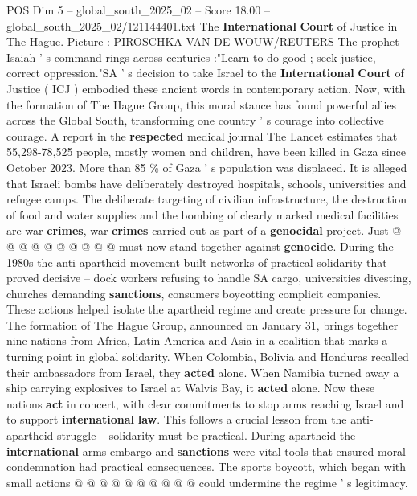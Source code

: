 \begin{textsample}{POS Dim 5 – global\_south\_2025\_02 – Score 18.00 – global\_south\_2025\_02/121144401.txt}  \label{ex:f5_pos_212}
The \textbf{International} \textbf{Court} of Justice in The Hague.
Picture : PIROSCHKA VAN DE WOUW/REUTERS The prophet Isaiah ' s command rings across centuries :"Learn to do good ; seek justice, correct oppression."SA ' s decision to take Israel to the \textbf{International} \textbf{Court} of Justice ( ICJ ) embodied these ancient words in contemporary action.
Now, with the formation of The Hague Group, this moral stance has found powerful allies across the Global South, transforming one country ' s courage into collective courage.
A report in the \textbf{respected} medical journal The Lancet estimates that 55,298-78,525 people, mostly women and children, have been killed in Gaza since October 2023.
More than 85 \% of Gaza ' s population was displaced.
It is alleged that Israeli bombs have deliberately destroyed hospitals, schools, universities and refugee camps.
The deliberate targeting of civilian infrastructure, the destruction of food and water supplies and the bombing of clearly marked medical facilities are war \textbf{crimes}, war \textbf{crimes} carried out as part of a \textbf{genocidal} project.
Just @ @ @ @ @ @ @ @ @ @ must now stand together against \textbf{genocide}.
During the 1980s the anti-apartheid movement built networks of practical solidarity that proved decisive -- dock workers refusing to handle SA cargo, universities divesting, churches demanding \textbf{sanctions}, consumers boycotting complicit companies.
These actions helped isolate the apartheid regime and create pressure for change.
The formation of The Hague Group, announced on January 31, brings together nine nations from Africa, Latin America and Asia in a coalition that marks a turning point in global solidarity.
When Colombia, Bolivia and Honduras recalled their ambassadors from Israel, they \textbf{acted} alone.
When Namibia turned away a ship carrying explosives to Israel at Walvis Bay, it \textbf{acted} alone.
Now these nations \textbf{act} in concert, with clear commitments to stop arms reaching Israel and to support \textbf{international} \textbf{law}.
This follows a crucial lesson from the anti-apartheid struggle -- solidarity must be practical.
During apartheid the \textbf{international} arms embargo and \textbf{sanctions} were vital tools that ensured moral condemnation had practical consequences.
The sports boycott, which began with small actions @ @ @ @ @ @ @ @ @ @ could undermine the regime ' s legitimacy.

\end{textsample}
